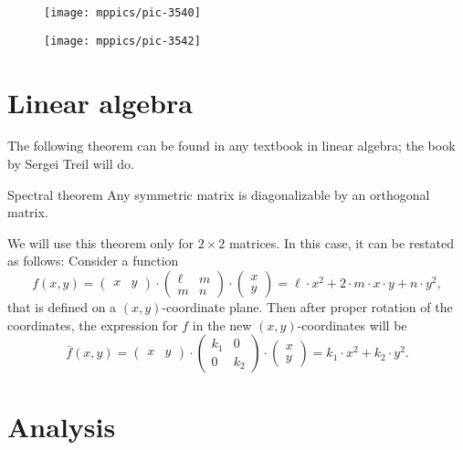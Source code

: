 \begin{figure}[ht!]
\begin{minipage}{.48\textwidth}
\centering
\texttt{[image: mppics/pic-3540]}
\end{minipage}\hfill
\begin{minipage}{.48\textwidth}
\centering
\texttt{[image: mppics/pic-3542]}
\end{minipage}
\end{figure}

\section{Linear algebra}

The following theorem can be found in any textbook in linear algebra;
the book by Sergei Treil \cite{treil} will do.

\begin{thm}{Spectral theorem}\label{thm:spectral}
Any symmetric matrix is diagonalizable  by an orthogonal matrix.
\end{thm}

We will use this theorem only for $2{\times}2$ matrices.
In this case, it can be restated as follows:
Consider a function 
\[f(x,y)=
\begin{pmatrix}
x&y
\end{pmatrix}
\cdot
\begin{pmatrix}
\ell&m
\\
m&n
\end{pmatrix}
\cdot
\begin{pmatrix}
x\\y
\end{pmatrix}
=\ell\cdot x^2+2\cdot m\cdot x\cdot y+n\cdot y^2,\]
that is defined on a $(x,y)$-coordinate plane.
Then after proper rotation of the coordinates, 
the expression for $f$ in the new $(x,y)$-coordinates will be
\[\bar f(x,y)=
\begin{pmatrix}
x&y
\end{pmatrix}
\cdot
\begin{pmatrix}
k_1&0
\\
0&k_2
\end{pmatrix}
\cdot
\begin{pmatrix}
x\\y
\end{pmatrix}
=k_1\cdot x^2+k_2\cdot y^2.\]

\section{Analysis}\label{sec:analysis}

